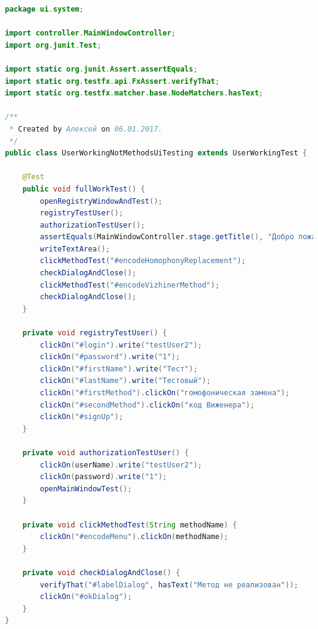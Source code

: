 \documentclass[a4paper,12pt]{article}
\begin{document}
\begin{lstlisting}[language=java, caption=код модуля UserWorkingNotMethodsUiTesting.java]
package ui.system;

import controller.MainWindowController;
import org.junit.Test;

import static org.junit.Assert.assertEquals;
import static org.testfx.api.FxAssert.verifyThat;
import static org.testfx.matcher.base.NodeMatchers.hasText;

/**
 * Created by Алексей on 06.01.2017.
 */
public class UserWorkingNotMethodsUiTesting extends UserWorkingTest {

    @Test
    public void fullWorkTest() {
        openRegistryWindowAndTest();
        registryTestUser();
        authorizationTestUser();
        assertEquals(MainWindowController.stage.getTitle(), "Добро пожаловать, Тест");
        writeTextArea();
        clickMethodTest("#encodeHomophonyReplacement");
        checkDialogAndClose();
        clickMethodTest("#encodeVizhinerMethod");
        checkDialogAndClose();
    }

    private void registryTestUser() {
        clickOn("#login").write("testUser2");
        clickOn("#password").write("1");
        clickOn("#firstName").write("Тест");
        clickOn("#lastName").write("Тестовый");
        clickOn("#firstMethod").clickOn("гомофоническая замена");
        clickOn("#secondMethod").clickOn("код Виженера");
        clickOn("#signUp");
    }

    private void authorizationTestUser() {
        clickOn(userName).write("testUser2");
        clickOn(password).write("1");
        openMainWindowTest();
    }

    private void clickMethodTest(String methodName) {
        clickOn("#encodeMenu").clickOn(methodName);
    }

    private void checkDialogAndClose() {
        verifyThat("#labelDialog", hasText("Метод не реализован"));
        clickOn("#okDialog");
    }
}
\end{lstlisting}
\end{document}
